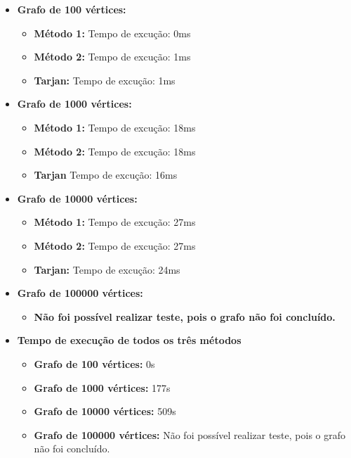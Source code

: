 \begin{itemize}
    \item \textbf{Grafo de 100 vértices:} 
    \begin{itemize}
        \item \textbf{Método 1:} Tempo de excução: 0ms
        \item \textbf{Método 2:} Tempo de excução: 1ms
        \item \textbf{Tarjan:} Tempo de excução: 1ms
    \end{itemize}
    \item \textbf{Grafo de 1000 vértices:} 
    \begin{itemize}
        \item \textbf{Método 1: } Tempo de excução: 18ms
        \item \textbf{Método 2:} Tempo de excução: 18ms
        \item \textbf{Tarjan} Tempo de excução: 16ms
    \end{itemize}
    \item \textbf{Grafo de 10000 vértices:}
    \begin{itemize}
        \item \textbf{Método 1:} Tempo de excução: 27ms
        \item \textbf{Método 2:} Tempo de excução: 27ms
        \item \textbf{Tarjan:} Tempo de excução: 24ms
    \end{itemize}
     \item \textbf{Grafo de 100000 vértices:}
    \begin{itemize}
    \item \textbf{Não foi possível realizar teste, pois o grafo não foi concluído.}
    \end{itemize}
    
    \item \textbf{Tempo de execução de todos os três métodos}
    \begin{itemize}
        \item \textbf{Grafo de 100 vértices: } 0s
        \item \textbf{Grafo de 1000 vértices: } 177s
        \item \textbf{Grafo de 10000 vértices: } 509s
        \item \textbf{Grafo de 100000 vértices: }Não foi possível realizar teste, pois o grafo não foi concluído.
    \end{itemize}
    
\end{itemize}

